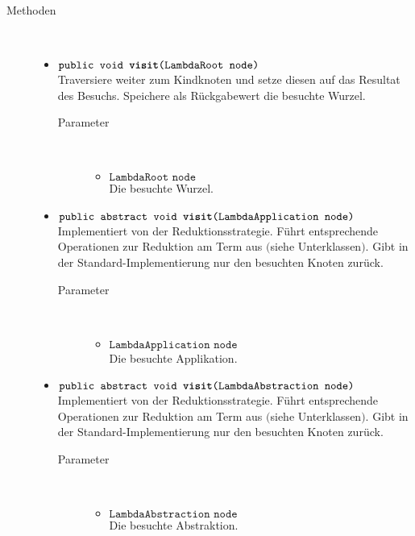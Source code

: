 \begin{description}
\item[Methoden] \hfill \\
	\vspace{-.8cm}
	\begin{itemize}
		\item $\texttt{public void \textbf{visit}(LambdaRoot node)}$ \\ Traversiere weiter zum Kindknoten und setze diesen auf das Resultat des Besuchs. Speichere als Rückgabewert die besuchte Wurzel.
		\begin{description}
			\item[Parameter] \hfill \\
			\vspace{-.8cm}
			\begin{itemize}
				\item $\texttt{LambdaRoot node}$ \\ Die besuchte Wurzel.
			\end{itemize}
		\end{description}
				
		\item $\texttt{public abstract void \textbf{visit}(LambdaApplication node)}$ \\ Implementiert von der Reduktionsstrategie. Führt entsprechende Operationen zur Reduktion am Term aus $($siehe Unterklassen$)$. Gibt in der Standard-Implementierung nur den besuchten Knoten zurück.
		\begin{description}
			\item[Parameter] \hfill \\
			\vspace{-.8cm}
			\begin{itemize}
				\item $\texttt{LambdaApplication node}$ \\ Die besuchte Applikation.
			\end{itemize}
		\end{description}
		
		\item $\texttt{public abstract void \textbf{visit}(LambdaAbstraction node)}$ \\ Implementiert von der Reduktionsstrategie. Führt entsprechende Operationen zur Reduktion am Term aus $($siehe Unterklassen$)$. Gibt in der Standard-Implementierung nur den besuchten Knoten zurück.
		\begin{description}
			\item[Parameter] \hfill \\
			\vspace{-.8cm}
			\begin{itemize}
				\item $\texttt{LambdaAbstraction node}$ \\ Die besuchte Abstraktion.
			\end{itemize}
		\end{description}
		

\end{itemize}
\end{description}
